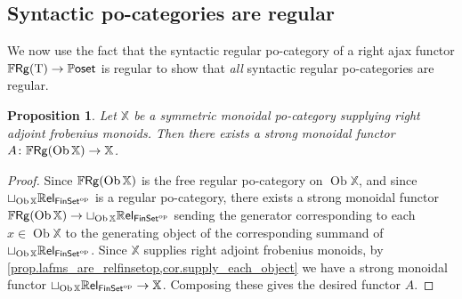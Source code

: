 \documentclass[11pt, oneside, article]{memoir}
\theoremstyle{plain}
\newtheorem{proposition}[theorem]{Proposition}
\theoremstyle{definition}
\theoremstyle{remark}
\newcommand{\Set}[1]{\mathrm{#1}}%
\newcommand{\Cat}[1]{{\mathsf{#1}}}%
\newcommand{\CCat}[1]{\mathbb{\StrLeft{#1}{1}}\Cat{\StrGobbleLeft{#1}{1}}}%
\DeclareMathOperator{\ob}{\Set{Ob}}
\newcommand{\tn}[1]{\textnormal{#1}}
\newcommand{\op}{^{\tn{op}}}
\newcommand{\finset}{\Cat{FinSet}}
\newcommand{\xx}{\mathbb{X}}
\newcommand{\types}{\Set{T}}
\newcommand{\rrel}[1]{\CCat{Rel}_{#1}}
\newcommand{\pposet}{\CCat{Poset}}
\newcommand{\ffrg}[1][\types]{
  \ifthenelse{\equal{#1}{blank}}{\CCat{FRg}}{\CCat{FRg}(#1)}
}
\begin{document}
\subsection{Syntactic po-categories are regular}
We now use the fact that the syntactic regular po-category of a right ajax functor $\ffrg \to \pposet$ is regular to show that \emph{all} syntactic regular po-categories are regular.

\begin{proposition} \label{prop.supplying_lafcs_gives_ffrg_functor}
	Let $\xx$ be a symmetric monoidal po-category supplying right adjoint frobenius monoids. Then there exists a strong monoidal functor $A\colon \ffrg[\ob\xx] \to \xx$.
\end{proposition}
\begin{proof}
   Since $\ffrg[\ob\xx]$ is the free regular po-category on $\ob\xx$, and since $\sqcup_{\ob\xx} \rrel{\finset\op}$ is a regular po-category, there exists a strong monoidal functor $\ffrg[\ob\xx] \to \sqcup_{\ob \xx}\rrel{\finset\op}$ sending the generator corresponding to each $x \in \ob\xx$ to the generating object of the corresponding summand of $\sqcup_{\ob \xx}\rrel{\finset\op}$. Since $\xx$ supplies right adjoint frobenius monoids, by \cref{prop.lafms_are_relfinsetop,cor.supply_each_object} we have a strong monoidal functor $\sqcup_{\ob \xx} \rrel{\finset\op} \to \xx$. Composing these gives the desired functor $A$.
\end{proof}
\end{document}
